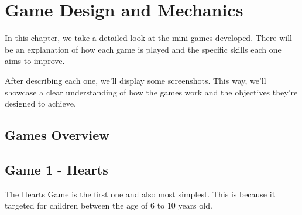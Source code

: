 \raggedbottom
\chapter{Game Design and Mechanics}
\label{cha:games_to_be_developed}


In this chapter, we take a detailed look at the mini-games developed. There will be an explanation of how each game is played and the specific skills each one aims to improve.

After describing each one, we'll display some screenshots. This way, we'll showcase a clear understanding of how the games work and the objectives they’re designed to achieve.



\newpage
\section{Games Overview}

\newpage
\section{Game 1 - Hearts}

The Hearts Game is the first one and also most simplest. This is because it targeted for children between the age of 6 to 10 years old.

